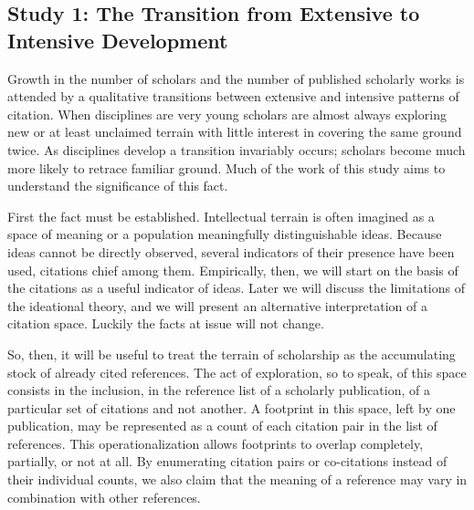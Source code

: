 \documentclass [PhD] {uclathes}
\begin{document}
\subsection{Study 1: The Transition from Extensive to Intensive
Development}\label{study-1-the-transition-from-extensive-to-intensive-development}

Growth in the number of scholars and the number of published scholarly
works is attended by a qualitative transitions between extensive and
intensive patterns of citation. When disciplines are very young scholars
are almost always exploring new or at least unclaimed terrain with
little interest in covering the same ground twice. As disciplines
develop a transition invariably occurs; scholars become much more likely
to retrace familiar ground. Much of the work of this study aims to
understand the significance of this fact.

First the fact must be established. Intellectual terrain is often
imagined as a space of meaning or a population meaningfully
distinguishable ideas. Because ideas cannot be directly observed,
several indicators of their presence have been used, citations chief
among them. Empirically, then, we will start on the basis of the
citations as a useful indicator of ideas. Later we will discuss the
limitations of the ideational theory, and we will present an alternative
interpretation of a citation space. Luckily the facts at issue will not
change.

So, then, it will be useful to treat the terrain of scholarship as the
accumulating stock of already cited references. The act of exploration,
so to speak, of this space consists in the inclusion, in the reference
list of a scholarly publication, of a particular set of citations and
not another. A footprint in this space, left by one publication, may be
represented as a count of each citation pair in the list of references.
This operationalization allows footprints to overlap completely,
partially, or not at all. By enumerating citation pairs or co-citations
instead of their individual counts, we also claim that the meaning of a
reference may vary in combination with other references.
\end{document}
